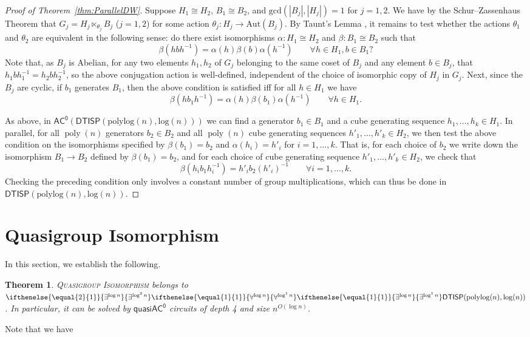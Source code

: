 \documentclass{article}
\newtheorem{theorem}{Theorem}\newtheorem{lemma}[theorem]{Lemma}\newtheorem{proposition}[theorem]{Proposition}\newtheorem{corollary}[theorem]{Corollary}\newtheorem{definition}[theorem]{Definition}\newtheorem{claim}[theorem]{Claim}\newtheorem{remark}[theorem]{Remark}\newtheorem{observation}[theorem]{Observation}\newtheorem{conjecture}[theorem]{Conjecture}\newtheorem{example}[theorem]{Example}
\newcommand{\algprobm}[1]{\textsc{#1}\xspace}
\newcommand{\betacc}[1]{\ifthenelse{\equal{#1}{1}}{\exists^{\log n}}{\exists^{\log^{#1}n}}} %
\newcommand{\alphacc}[1]{\ifthenelse{\equal{#1}{1}}{\forall^{\log n}}{\forall^{\log^{#1}n}}} %
\newcommand{\Oh}{O}
\DeclareMathOperator{\poly}{poly}
\newcommand*{\ComplexityClass}[1]{\ensuremath{\mathsf{#1}}\xspace}
\newcommand{\DTISP}{\ComplexityClass{DTISP}}
\newcommand{\DTISPpll}{\ensuremath{\DTISP(\mathrm{polylog}(n),\mathrm{log}(n))}\xspace}
\newcommand{\ACz}{\ComplexityClass{AC^0}}
\newcommand{\qACz}{\ComplexityClass{quasiAC^0}}
\begin{document}
\begin{proof}[Proof of Theorem~\ref{thm:ParallelDW}]
Suppose $H_{1} \cong H_{2}$, $B_{1} \cong B_{2}$, and $\text{gcd}(|B_{j}|, |H_{j}|) = 1$ for $j = 1,2$. We have by the Schur--Zassenhaus Theorem that $G_{j} = H_{j} \ltimes_{\theta_{j}} B_{j}$ ($j = 1,2$) for some action $\theta_j \colon H_j \to \text{Aut}(B_j)$. By Taunt's Lemma \cite{Taunt1955}, it remains to test whether the actions $\theta_{1}$ and $\theta_{2}$ are equivalent in the following sense: do there exist  isomorphisms $\alpha \colon H_1 \cong H_2$ and $\beta \colon B_1 \cong B_2$ such that
\[
\beta(h bh^{-1}) = \alpha(h) \beta(b) \alpha(h^{-1}) \qquad \forall h \in H_1, b \in B_1?
\]
Note that, as $B_{j}$ is Abelian, for any two elements $h_{1}, h_{2}$ of $G_{j}$ belonging to the same coset of $B_j$ and any element $b \in B_{j}$, that $h_{1}bh_{1}^{-1} = h_{2}bh_{2}^{-1}$, so the above conjugation action is well-defined, independent of the choice of isomorphic copy of $H_j$ in $G_j$. Next, since the $B_j$ are cyclic, if $b_1$ generates $B_1$, then the above condition is satisfied iff for all $h \in H_1$ we have
\[
\beta(h b_1 h^{-1}) = \alpha(h) \beta(b_1) \alpha(h^{-1}) \qquad \forall h \in H_1.
\]

As above, in $\ACz(\DTISPpll)$ we can find a generator $b_1 \in B_1$ and a cube generating sequence $h_1,\dotsc,h_k \in H_1$. In parallel, for all $\poly(n)$ generators $b_2 \in B_2$ and all $\poly(n)$ cube generating sequences $h'_1,\dotsc,h'_k \in H_2$, we then test the above condition on the isomorphisms specified by $\beta(b_1) = b_2$ and $\alpha(h_i) = h'_i$ for $i=1,\dotsc,k$. That is, for each choice of $b_2$ we write down the isomorphism $B_1 \to B_2$ defined by $\beta(b_1) = b_2$, and for each choice of cube generating sequence $h'_1,\dotsc,h'_k \in H_2$, we check that
\[
\beta(h_i b_1 h_i^{-1}) = h'_i b_2 (h'_i)^{-1} \qquad \forall i=1,\dotsc,k.
\]
Checking the preceding condition only involves a constant number of group multiplications, which can thus be done in $\DTISPpll$.\qedhere
\end{proof}





\section{Quasigroup Isomorphism} \label{sec:QuasigroupIsomorphism}

In this section, we establish the following.

\begin{theorem} \label{thm:QuasigroupIsoPolylogtime}
\algprobm{Quasigroup Isomorphism} belongs to $\betacc{2}\alphacc{1}\betacc{1}\DTISPpll$. In particular, it can be solved by $\qACz$ circuits of depth 4 and size $n^{\Oh(\log n)}$.
\end{theorem}
Note that we have 
\end{document}
